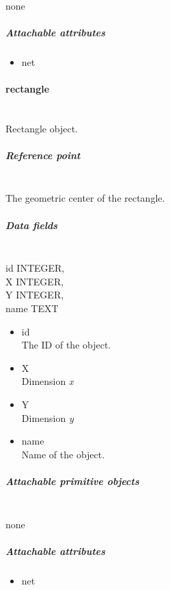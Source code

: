\documentclass[12pt]{article}
\begin{document}
\mbox{}\\

none

\subparagraph{Attachable attributes}\label{attachable-attributes-1}

\begin{itemize}
\itemsep1pt\parskip0pt
\item
  net
\end{itemize}

\paragraph{rectangle}\label{rectangle}

\mbox{}\\

Rectangle object.

\subparagraph{Reference point}\label{reference-point-2}

\mbox{}\\

The geometric center of the rectangle.

\subparagraph{Data fields}\label{data-fields-2}

\mbox{}\\

id INTEGER,\\X INTEGER,\\Y INTEGER,\\name TEXT

\begin{itemize}
\item
  id\\The ID of the object.
\item
  X\\Dimension \emph{x}
\item
  Y\\Dimension \emph{y}
\item
  name\\Name of the object.
\end{itemize}

\subparagraph{Attachable primitive
objects}\label{attachable-primitive-objects-2}

\mbox{}\\

none

\subparagraph{Attachable attributes}\label{attachable-attributes-2}

\begin{itemize}
\itemsep1pt\parskip0pt
\item
  net
\end{itemize}
\end{document}

